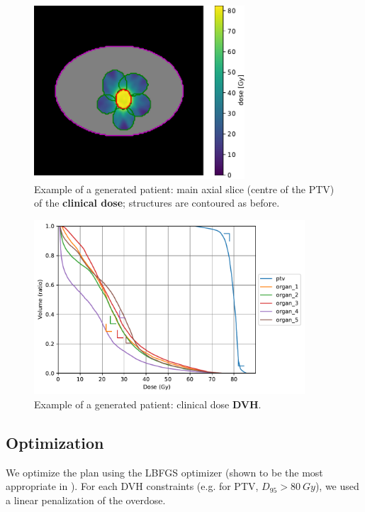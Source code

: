\begin{figure}
	\centering
	\includegraphics[width=0.7\textwidth]{main_slice-dose.pdf}
	\caption{Example of a generated patient: main axial slice (centre of the PTV) of the \textbf{clinical dose}; structures are contoured as before.}
	\label{fig:main_slice-dose}
\end{figure}
\begin{figure}
	\centering
	\includegraphics[width=0.9\textwidth]{dvh_example.pdf}
	\caption{Example of a generated patient: clinical dose \textbf{DVH}.}
	\label{fig:clinical_dvh}
\end{figure}

\subsection*{Optimization}
We optimize the plan using the LBFGS optimizer (shown to be the most appropriate in \cite{dubois_radiotherapy_2023}).
For each DVH constraints (e.g. for PTV, $D_{95}>80 \ Gy$), we used a linear penalization of the overdose.
